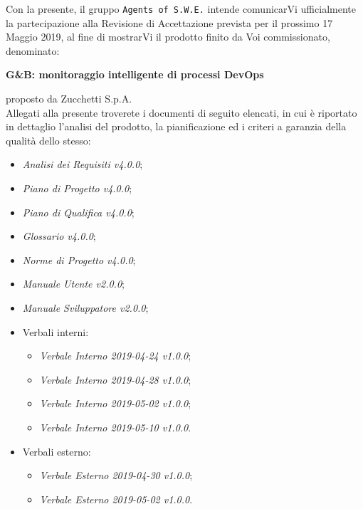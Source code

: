 \documentclass[11pt, a4paper]{letter} %
\begin{document}
\begin{letter}
		Con la presente, il gruppo \texttt{Agents of S.W.E.} intende comunicarVi ufficialmente la partecipazione alla Revisione di Accettazione prevista per il prossimo 17 Maggio 2019, al fine di mostrarVi il prodotto finito da Voi commissionato, denominato:
		\begin{center}
			\textbf{G\&B: monitoraggio intelligente di processi DevOps}
		\end{center}
		proposto da Zucchetti S.p.A.\\
		Allegati alla presente troverete i documenti di seguito elencati, in cui è riportato in dettaglio l'analisi del prodotto, la pianificazione ed i criteri a garanzia della qualità dello stesso:
		\begin{itemize}
			\item \textit{Analisi dei Requisiti v4.0.0};
			\item \textit{Piano di Progetto v4.0.0};
			\item \textit{Piano di Qualifica v4.0.0};
			\item \textit{Glossario v4.0.0};
			\item \textit{Norme di Progetto v4.0.0};	
			\item \textit{Manuale Utente v2.0.0};
			\item \textit{Manuale Sviluppatore v2.0.0};
			\item Verbali interni: 
			\begin{itemize}
				\item \textit{Verbale Interno 2019-04-24 v1.0.0};
				\item \textit{Verbale Interno 2019-04-28 v1.0.0};
				\item \textit{Verbale Interno 2019-05-02 v1.0.0};
				\item \textit{Verbale Interno 2019-05-10 v1.0.0}.
			\end{itemize}
			\item Verbali esterno: 
			\begin{itemize}
				\item \textit{Verbale Esterno 2019-04-30 v1.0.0};
				\item \textit{Verbale Esterno 2019-05-02 v1.0.0}.
			\end{itemize}

\end{itemize}
\end{letter}
\end{document}
